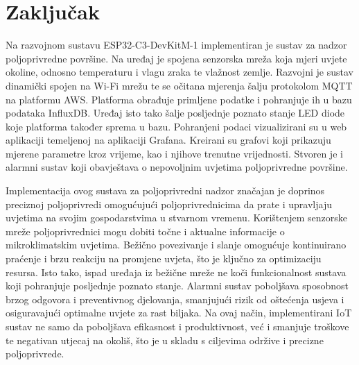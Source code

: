 \chapter{Zaključak}

Na razvojnom sustavu ESP32-C3-DevKitM-1 implementiran je sustav za nadzor poljoprivredne površine. Na uređaj je spojena senzorska mreža koja mjeri uvjete okoline, odnosno temperaturu i vlagu zraka te vlažnost zemlje. Razvojni je sustav dinamički spojen na Wi-Fi mrežu te se očitana mjerenja šalju protokolom MQTT na platformu AWS. Platforma obrađuje primljene podatke i pohranjuje ih u bazu podataka InfluxDB. Uređaj isto tako šalje posljednje poznato stanje LED diode koje platforma također sprema u bazu. Pohranjeni podaci vizualizirani su u web aplikaciji temeljenoj na aplikaciji Grafana. Kreirani su grafovi koji prikazuju mjerene parametre kroz vrijeme, kao i njihove trenutne vrijednosti. Stvoren je i alarmni sustav koji obavještava o nepovoljnim uvjetima poljoprivredne površine. 

Implementacija ovog sustava za poljoprivredni nadzor značajan je doprinos preciznoj poljoprivredi omogućujući poljoprivrednicima da prate i upravljaju uvjetima na svojim gospodarstvima u stvarnom vremenu. Korištenjem senzorske mreže poljoprivrednici mogu dobiti točne i aktualne informacije o mikroklimatskim uvjetima. Bežično povezivanje i slanje omogućuje kontinuirano praćenje i brzu reakciju na promjene uvjeta, što je ključno za optimizaciju resursa. Isto tako, ispad uređaja iz bežične mreže ne koči funkcionalnost sustava koji pohranjuje posljednje poznato stanje. Alarmni sustav poboljšava sposobnost brzog odgovora i preventivnog djelovanja, smanjujući rizik od oštećenja usjeva i osiguravajući optimalne uvjete za rast biljaka. Na ovaj način, implementirani IoT sustav ne samo da poboljšava efikasnost i produktivnost, već i smanjuje troškove te negativan utjecaj na okoliš, što je u skladu s ciljevima održive i precizne poljoprivrede.



\eject